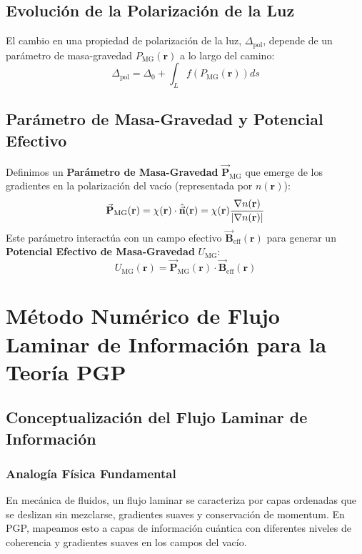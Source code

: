 \documentclass{book}
\newcommand{\bvec}[1]{\vec{\mathbf{#1}}} %
\begin{document}
\subsection{Evolución de la Polarización de la Luz}
\label{sec:light_polarization_evolution}
El cambio en una propiedad de polarización de la luz, $\Delta_{\text{pol}}$, depende de un parámetro de masa-gravedad $P_{\text{MG}}(\mathbf{r})$ a lo largo del camino:
\begin{equation}
    \Delta_{\text{pol}} = \Delta_0 + \int_{L} f(P_{\text{MG}}(\mathbf{r})) ds
    \label{eq:polarization_evolution}
\end{equation}

\subsection{Parámetro de Masa-Gravedad y Potencial Efectivo}
\label{sec:pmg_umg}
Definimos un \textbf{Parámetro de Masa-Gravedad} $\bvec{P}_{\text{MG}}$ que emerge de los gradientes en la polarización del vacío (representada por $n(\mathbf{r})$):
\begin{equation}
    \bvec{P}_{\text{MG}}(\mathbf{r}) = \chi(\mathbf{r}) \cdot \hat{\bvec{n}}(\mathbf{r}) = \chi(\mathbf{r}) \frac{\nabla n(\mathbf{r})}{\abs{\nabla n(\mathbf{r})}}
    \label{eq:pmg_definition}
\end{equation}
Este parámetro interactúa con un campo efectivo $\bvec{B}_{\text{eff}}(\mathbf{r})$ para generar un \textbf{Potencial Efectivo de Masa-Gravedad} $U_{\text{MG}}$:
\begin{equation}
    U_{\text{MG}}(\mathbf{r}) = \bvec{P}_{\text{MG}}(\mathbf{r}) \cdot \bvec{B}_{\text{eff}}(\mathbf{r})
    \label{eq:umg_definition}
\end{equation}

\section{Método Numérico de Flujo Laminar de Información para la Teoría PGP}

\subsection{Conceptualización del Flujo Laminar de Información}
\subsubsection{Analogía Física Fundamental}
En mecánica de fluidos, un flujo laminar se caracteriza por capas ordenadas que se deslizan sin mezclarse, gradientes suaves y conservación de momentum. En PGP, mapeamos esto a capas de información cuántica con diferentes niveles de coherencia y gradientes suaves en los campos del vacío.
\end{document}
